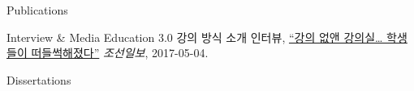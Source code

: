 \begin{rSection}{Publications}
{\begin{pubSubsectionNum}{Interview \& Media}
    Education 3.0 강의 방식 소개 인터뷰,
    \hyperlink{http://news.chosun.com/site/data/html_dir/2017/05/04/2017050400133.html}{``강의 없앤 강의실… 학생들이 떠들썩해졌다''}
    \textit{조선일보}, 2017-05-04.

  \end{pubSubsectionNum}
}

\newpage
\begin{pubSubsectionNum}{Dissertations}
  \item {}
  \item {}
\end{pubSubsectionNum}


\end{rSection}

